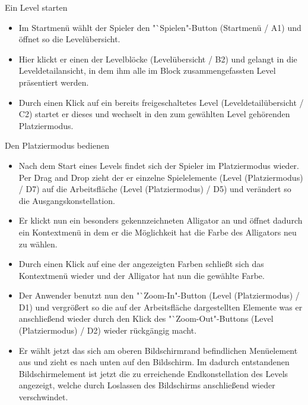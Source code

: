 \begin{requirements}
\begin{itemize}
	\end{itemize}
	

	 Ein Level starten
	
	
	\begin{itemize}
  			\item Im Startmenü wählt der Spieler den "`Spielen"-Button (Startmenü / A1) und öffnet so die Levelübersicht.
  			
  			\item Hier klickt er einen der Levelblöcke (Levelübersicht / B2) und gelangt in die Leveldetailansicht, in dem ihm alle im Block zusammengefassten Level präsentiert werden.
  			
  			\item Durch einen Klick auf ein bereits freigeschaltetes Level (Leveldetailübersicht / C2) startet er dieses und wechselt in den zum gewählten Level gehörenden Platziermodus.
  	\end{itemize}
  	
  	
  	
  	 Den Platziermodus bedienen
  	
	
	\begin{itemize}
			\item Nach dem Start eines Levels findet sich der Spieler im Platziermodus wieder. Per Drag and Drop zieht der er einzelne Spielelemente (Level (Platziermodus) / D7) auf die Arbeitsfläche (Level (Platziermodus) / D5) und verändert so die Ausgangskonstellation.
  			
  			\item Er klickt nun ein besonders gekennzeichneten Alligator an und öffnet dadurch ein Kontextmenü in dem er die Möglichkeit hat die Farbe des Alligators neu zu wählen.
  			
  			\item Durch einen Klick auf eine der angezeigten Farben schließt sich das Kontextmenü wieder und der Alligator hat nun die gewählte Farbe.
  			
  			\item Der Anwender benutzt nun den "`Zoom-In"-Button (Level (Platziermodus) / D1) und vergrößert so die auf der Arbeitsfläche dargestellten Elemente was er anschließend wieder durch den Klick des "`Zoom-Out"-Buttons  (Level (Platziermodus) / D2) wieder rückgängig macht.
  			
  			\item Er wählt jetzt das sich am oberen Bildschirmrand befindlichen Menüelement aus und zieht es nach unten auf den Bildschirm. Im dadurch entstandenen Bildschirmelement ist jetzt die zu erreichende Endkonstellation des Levels angezeigt, welche durch Loslassen des Bildschirms anschließend wieder verschwindet. 
  			

\end{itemize}
\end{requirements}
